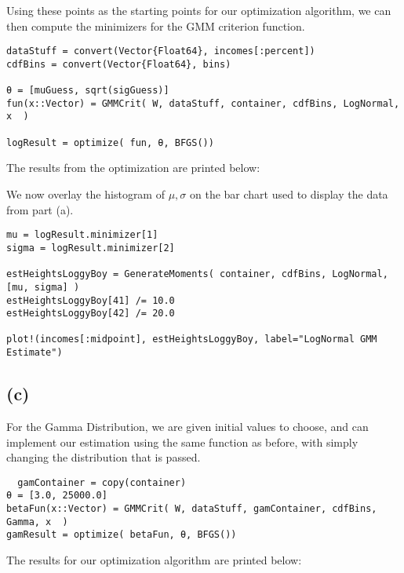 \documentclass[12pt]{paper}
\begin{document}
Using these points as the starting points for our optimization
algorithm, we can then compute the minimizers for the GMM criterion
function.

\begin{verbatim}
dataStuff = convert(Vector{Float64}, incomes[:percent])
cdfBins = convert(Vector{Float64}, bins)

θ = [muGuess, sqrt(sigGuess)]
fun(x::Vector) = GMMCrit( W, dataStuff, container, cdfBins, LogNormal, x  )

logResult = optimize( fun, θ, BFGS())
\end{verbatim}

The results from the optimization are printed below:

We now overlay the histogram of $\mu,\sigma$ on the bar chart used to display
the data from part (a).
\begin{verbatim}
mu = logResult.minimizer[1]
sigma = logResult.minimizer[2]

estHeightsLoggyBoy = GenerateMoments( container, cdfBins, LogNormal, [mu, sigma] )
estHeightsLoggyBoy[41] /= 10.0
estHeightsLoggyBoy[42] /= 20.0

plot!(incomes[:midpoint], estHeightsLoggyBoy, label="LogNormal GMM Estimate")
\end{verbatim}

\subsection{(c)}

For the Gamma Distribution, we are given initial values to choose, and
can implement our estimation using the same function as before, with
simply changing the distribution that is passed.

\begin{verbatim}
  gamContainer = copy(container)
θ = [3.0, 25000.0]
betaFun(x::Vector) = GMMCrit( W, dataStuff, gamContainer, cdfBins, Gamma, x  )
gamResult = optimize( betaFun, θ, BFGS())
\end{verbatim}

The results for our optimization algorithm are printed below:
\end{document}
